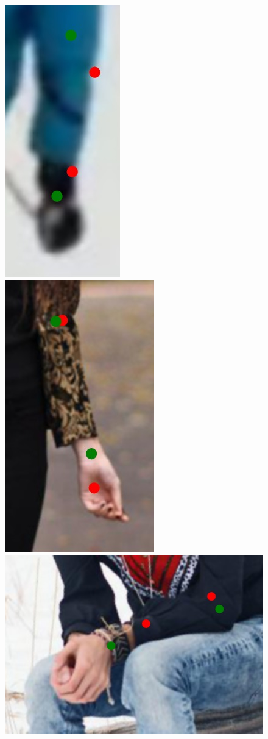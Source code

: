 \begin{figure}
    \includegraphics[height=\fh]{resources/Annotation_Correction/Fixing/fix_14}
    \hfill
    \includegraphics[height=\fh]{resources/Annotation_Correction/Fixing/fix_15}
    \hfill
    \includegraphics[height=\fh]{resources/Annotation_Correction/Fixing/fix_17}

\end{figure}
